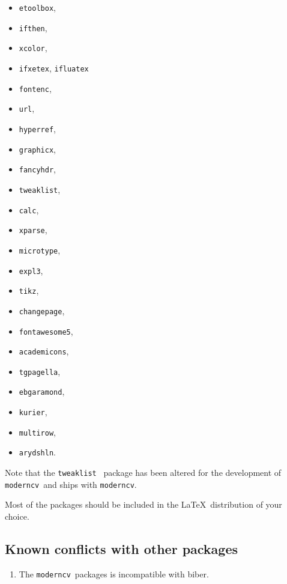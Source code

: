 \documentclass[a4paper,11pt]{article}
\newcommand{\code}[1]{\lstinline!#1!}
\newcommand{\Code}[1]{\lstinline!#1!~} %
\newcommand{\moderncv}{\code{moderncv}}
\newcommand{\Moderncv}{\Code{moderncv}}
\begin{document}
\begin{itemize}
  \item \code{etoolbox},
  \item \code{ifthen},
  \item \code{xcolor},
  \item \code{ifxetex}, \code{ifluatex}
  \item \code{fontenc},
  \item \code{url},
  \item \code{hyperref},
  \item \code{graphicx},
  \item \code{fancyhdr},
  \item \code{tweaklist},
  \item \code{calc},
  \item \code{xparse},
  \item \code{microtype},
  \item \code{expl3},
  \item \code{tikz},
  \item \code{changepage},
  \item \code{fontawesome5},
  \item \code{academicons},
  \item \code{tgpagella},
  \item \code{ebgaramond},
  \item \code{kurier},
  \item \code{multirow},
  \item \code{arydshln}.
\end{itemize}

Note that the \Code{tweaklist} package has been altered for the development of \Moderncv and ships
with \moderncv.

Most of the packages should be included in the \LaTeX\ distribution of your choice.

\subsection{Known conflicts with other packages}
\begin{enumerate}
  \item The \Moderncv packages is incompatible with biber.
\end{enumerate}
\end{document}
